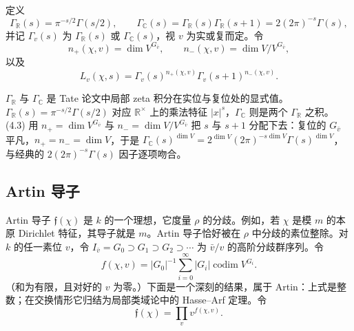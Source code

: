 定义
\begin{equation}\tag{4.1}\label{c4:eq:4.1}
\Gamma_{\mathbb{R}}(s)=\pi^{-s/2}\Gamma(s/2),\qquad
\Gamma_{\mathbb{C}}(s)=\Gamma_{\mathbb{R}}(s)\Gamma_{\mathbb{R}}(s+1)=2(2\pi)^{-s}\Gamma(s),
\end{equation}
并记 $\Gamma_v(s)$ 为 $\Gamma_{\mathbb{R}}(s)$ 或 $\Gamma_{\mathbb{C}}(s)$，视 $v$ 为实或复而定。令
\begin{equation}\tag{4.2}\label{c4:eq:4.2}
n_+(\chi,v)=\dim V^{G_{\bar v}},\qquad n_-(\chi,v)=\dim V/V^{G_{\bar v}},
\end{equation}
以及
\begin{equation}\tag{4.3}\label{c4:eq:4.3}
L_v(\chi,s)=\Gamma_v(s)^{n_+(\chi,v)}\Gamma_v(s+1)^{n_-(\chi,v)}.
\end{equation}

\begin{annote}
$\Gamma_{\mathbb{R}}$ 与 $\Gamma_{\mathbb{C}}$ 是 Tate 论文中局部 zeta 积分在实位与复位处的显式值。$\Gamma_{\mathbb{R}}(s)=\pi^{-s/2}\Gamma(s/2)$ 对应 $\mathbb{R}^{\times}$ 上的乘法特征 $|x|^{s}$，$\Gamma_{\mathbb{C}}$ 则是两个 $\Gamma_{\mathbb{R}}$ 之积。(4.3) 用 $n_+=\dim V^{G_{\bar v}}$ 与 $n_-=\dim V/V^{G_{\bar v}}$ 把 $s$ 与 $s+1$ 分配下去：复位的 $G_{\bar v}$ 平凡，$n_+=n_-=\dim V$，于是 $\Gamma_{\mathbb{C}}(s)^{\dim V}=2^{\dim V}(2\pi)^{-s\dim V}\Gamma(s)^{\dim V}$，与经典的 $2(2\pi)^{-s}\Gamma(s)$ 因子逐项吻合。
\par\vspace{0.15em}{\raggedleft 【来源：Tate《Fourier analysis in number fields and Hecke's zeta-functions》（A）；Bump《Automorphic Forms and Representations》Ch.~3（A）】\par}
\end{annote}

\subsection{Artin 导子}\label{c4:sec:4.2}

Artin 导子 $\mathfrak{f}(\chi)$ 是 $k$ 的一个理想，它度量 $\rho$ 的分歧。例如，若 $\chi$ 是模 $m$ 的本原 Dirichlet 特征，其导子就是 $m$。Artin 导子恰好被在 $\rho$ 中分歧的素位整除。对 $k$ 的任一素位 $v$，令 $I_{\bar v}=G_0\supset G_1\supset G_2\supset\cdots$ 为 $\bar v/v$ 的高阶分歧群序列。令
\begin{equation}\tag{4.4}\label{c4:eq:4.4}
f(\chi,v)=|G_0|^{-1}\sum_{i=0}^{\infty}|G_i|\operatorname{codim}V^{G_i}.
\end{equation}
（和为有限，且对好的 $v$ 为零。）下面是一个深刻的结果，属于 Artin：上式是整数；在交换情形它归结为局部类域论中的 Hasse--Arf 定理。令
\begin{equation}\tag{4.5}\label{c4:eq:4.5}
\mathfrak{f}(\chi)=\prod_{v}v^{f(\chi,v)} .
\end{equation}

